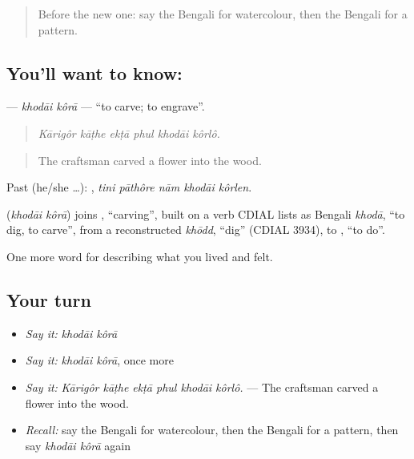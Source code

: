 \label{lesson:BN-C524-khodai-kora}



\begin{quote}
Before the new one: say the Bengali for watercolour, then the Bengali for a pattern.
\end{quote}

\subsection*{You'll want to know:  }
\textbf{ } — \emph{khodāi kôrā} — \textquotedblleft{}to carve; to engrave\textquotedblright{}.

\begin{quote}
     
\end{quote}

\begin{quote}
\emph{Kārigôr kāṭhe ekṭā phul khodāi kôrlô.}
\end{quote}

\begin{quote}
The craftsman carved a flower into the wood.
\end{quote}

Past (he/she …):     , \emph{tini pāthôre nām khodāi kôrlen}.

\begin{cousinweb}
\textbf{ } (\emph{khodāi kôrā}) joins , \textquotedblleft{}carving\textquotedblright{}, built on a verb CDIAL lists as Bengali \emph{khodā}, \textquotedblleft{}to dig, to carve\textquotedblright{}, from a reconstructed \emph{khōdd}, \textquotedblleft{}dig\textquotedblright{} (CDIAL 3934), to , \textquotedblleft{}to do\textquotedblright{}.
\end{cousinweb}

\begin{grammarlens}[title={What you've built}]
One more word for describing what you lived and felt.
\end{grammarlens}

\subsection*{Your turn}
\begin{itemize}
\raggedright
  \item \emph{Say it:} \emph{khodāi kôrā}
  \item \emph{Say it:} \emph{khodāi kôrā}, once more
  \item \emph{Say it:} \emph{Kārigôr kāṭhe ekṭā phul khodāi kôrlô.} — The craftsman carved a flower into the wood.
  \item \emph{Recall:} say the Bengali for watercolour, then the Bengali for a pattern, then say \emph{khodāi kôrā} again
\end{itemize}

